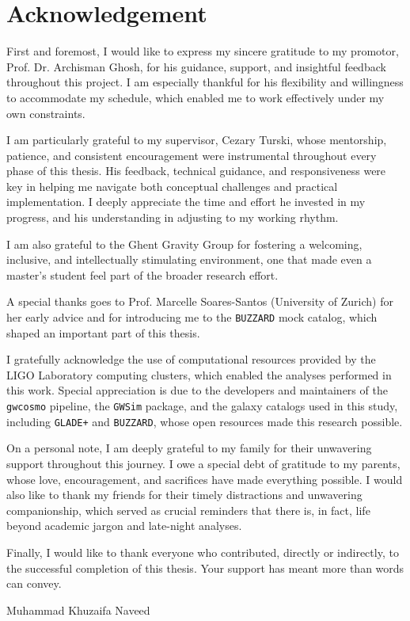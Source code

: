 %
\chapter*{Acknowledgement}
\label{sec:acknowledgement}
\vspace*{-10mm}
First and foremost, I would like to express my sincere gratitude to my promotor, Prof. Dr. Archisman Ghosh, for his guidance, support, and insightful feedback throughout this project. I am especially thankful for his flexibility and willingness to accommodate my schedule, which enabled me to work effectively under my own constraints.

I am particularly grateful to my supervisor, Cezary Turski, whose mentorship, patience, and consistent encouragement were instrumental throughout every phase of this thesis. His feedback, technical guidance, and responsiveness were key in helping me navigate both conceptual challenges and practical implementation. I deeply appreciate the time and effort he invested in my progress, and his understanding in adjusting to my working rhythm.

I am also grateful to the Ghent Gravity Group for fostering a welcoming, inclusive, and intellectually stimulating environment, one that made even a master's student feel part of the broader research effort.

A special thanks goes to Prof. Marcelle Soares-Santos (University of Zurich) for her early advice and for introducing me to the \texttt{BUZZARD} mock catalog, which shaped an important part of this thesis.

I gratefully acknowledge the use of computational resources provided by the LIGO Laboratory computing clusters, which enabled the analyses performed in this work. Special appreciation is due to the developers and maintainers of the \texttt{gwcosmo} pipeline, the \texttt{GWSim} package, and the galaxy catalogs used in this study, including \texttt{GLADE+} and \texttt{BUZZARD}, whose open resources made this research possible.

On a personal note, I am deeply grateful to my family for their unwavering support throughout this journey. I owe a special debt of gratitude to my parents, whose love, encouragement, and sacrifices have made everything possible. I would also like to thank my friends for their timely distractions and unwavering companionship, which served as crucial reminders that there is, in fact, life beyond academic jargon and late-night analyses.

Finally, I would like to thank everyone who contributed, directly or indirectly, to the successful completion of this thesis. Your support has meant more than words can convey.


\vspace{2em}
\noindent Muhammad Khuzaifa Naveed

